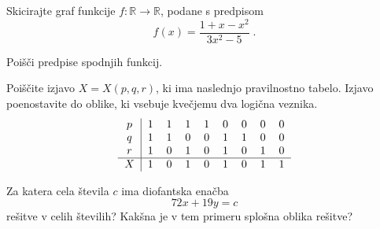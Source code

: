 \documentclass{izpit}
\begin{document}
\naloga[\tocke{16}]
  Skicirajte graf funkcije $f \colon \mathbb{R} \to \mathbb{R}$, podane s
  predpisom
  \[
    f(x) = \frac{1 + x - x^2}{3 x^2 - 5} \;.
  \]

  \dodatek{}
  
  
\naloga[\tocke{20}]
  \podnaloga[15]
  
  Poišči predpise spodnjih funkcij.
    
  \prostor[2] %

  \podnaloga[5]
    Poiščite izjavo $X = X(p, q, r)$, ki ima naslednjo pravilnostno tabelo.
    Izjavo poenostavite do oblike, ki vsebuje kvečjemu dva logična veznika.
    \[
      \begin{tabular}{c|cccccccc}
        $p$ & 1 & 1 & 1 & 1 & 0 & 0 & 0 & 0 \\
        $q$ & 1 & 1 & 0 & 0 & 1 & 1 & 0 & 0 \\
        $r$ & 1 & 0 & 1 & 0 & 1 & 0 & 1 & 0 \\\hline
        $X$ & 1 & 0 & 1 & 0 & 1 & 0 & 1 & 1 \\
      \end{tabular}
    \]
  \prostor


  Za katera cela števila $c$ ima diofantska enačba
  \[
    72 x + 19 y = c
  \]
  rešitve v celih številih? Kakšna je v tem primeru splošna oblika rešitve?



\end{document}
